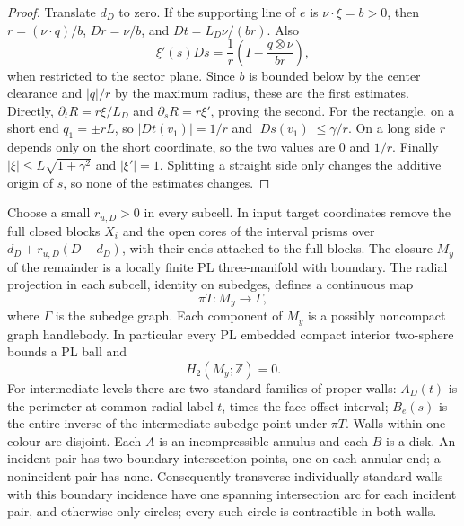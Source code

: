 \begin{proof}
Translate $d_D$ to zero.  If the supporting line of $e$ is
$\nu\cdot\xi=b>0$, then $r=(\nu\cdot q)/b$,
$Dr=\nu/b$, and $Dt=L_D\nu/(br)$.  Also
\[
 \xi'(s)D s=\frac1r\left(I-\frac{q\otimes\nu}{br}\right),
\]
when restricted to the sector plane.  Since $b$ is bounded below by
the center clearance and $|q|/r$ by the maximum radius, these are the
first estimates.  Directly,
$\partial_tR=r\xi/L_D$ and $\partial_sR=r\xi'$, proving the second.
For the rectangle, on a short end $q_1=\pm rL$, so
$|D t(v_1)|=1/r$ and $|D s(v_1)|\leq\gamma/r$.
On a long side $r$ depends only on the short coordinate, so the two
values are $0$ and $1/r$.  Finally $|\xi|\leq L\sqrt{1+\gamma^2}$
and $|\xi'|=1$.  Splitting a straight side only changes the additive
origin of $s$, so none of the estimates changes.
\end{proof}

\begin{proposition}\label{qt:exterior}
Choose a small $r_{u,D}>0$ in every subcell.  In input target
coordinates remove the full closed blocks $X_i$ and the open cores
of the interval prisms over
$d_D+r_{u,D}(D-d_D)$, with their ends attached to the full blocks.
The closure $M_y$ of the remainder is a locally finite PL
three-manifold with boundary.  The radial projection in each subcell,
identity on subedges, defines a continuous map
\[
 \pi T:M_y\longrightarrow\Gamma,
\]
where $\Gamma$ is the subedge graph.  Each component of $M_y$ is a
possibly noncompact graph handlebody.  In particular every PL embedded compact
interior two-sphere bounds a PL ball and
\begin{equation}\label{qt:exterior-homology}
 H_2(M_y;\mathbb Z)=0.
\end{equation}
For intermediate levels there are two standard families of proper
walls: $A_D(t)$ is the perimeter at common radial label $t$, times
the face-offset interval; $B_e(s)$ is the entire inverse of the
intermediate subedge point under $\pi T$.  Walls within one colour are
disjoint.  Each $A$ is an incompressible annulus and each $B$ is a disk.
An incident pair has two boundary intersection points, one on each
annular end; a nonincident pair has none.  Consequently transverse
individually standard walls with this boundary incidence have one
spanning intersection arc for each incident pair, and otherwise only
circles; every such circle is contractible in both walls.
\end{proposition}

